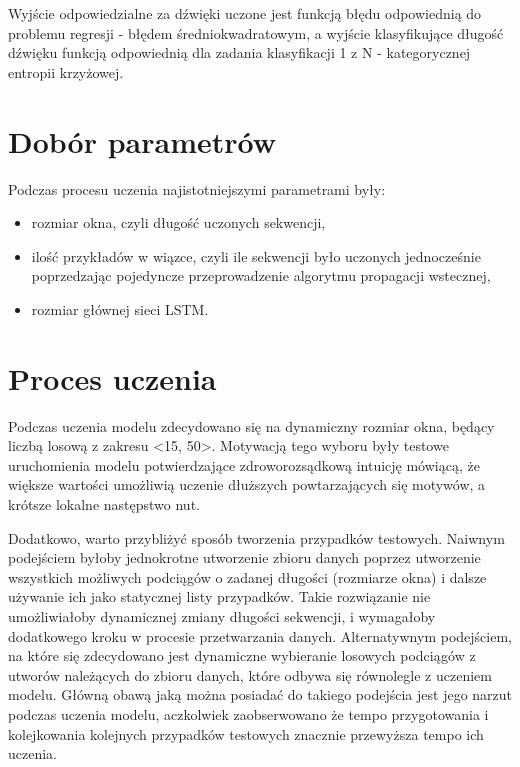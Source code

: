 {{        Wyjście odpowiedzialne za dźwięki uczone jest funkcją błędu odpowiednią do problemu 
        regresji - błędem średniokwadratowym, a wyjście klasyfikujące długość dźwięku funkcją odpowiednią
        dla zadania klasyfikacji 1 z N - kategorycznej entropii krzyżowej.
    }

    \section{Dobór parametrów}
    {
        Podczas procesu uczenia najistotniejszymi parametrami były:
        \begin{itemize}
            \item rozmiar okna, czyli długość uczonych sekwencji,
            \item ilość przykładów w wiązce, czyli ile sekwencji było uczonych jednocześnie
            poprzedzając pojedyncze przeprowadzenie algorytmu propagacji wstecznej,
            \item rozmiar głównej sieci LSTM.
        \end{itemize}
    }

    \section{Proces uczenia}
    {
        Podczas uczenia modelu zdecydowano się na dynamiczny rozmiar okna,
        będący liczbą losową z zakresu <15, 50>. Motywacją tego wyboru były testowe 
        uruchomienia modelu potwierdzające zdroworozsądkową intuicję mówiącą, że większe wartości
        umożliwią uczenie dłuższych powtarzających się motywów, a krótsze lokalne następstwo nut.

        Dodatkowo, warto przybliżyć sposób tworzenia przypadków testowych. Naiwnym podejściem byłoby
        jednokrotne utworzenie zbioru danych poprzez utworzenie wszystkich możliwych podciągów o zadanej
        długości (rozmiarze okna) i dalsze używanie ich jako statycznej listy przypadków. 
        Takie rozwiązanie nie umożliwiałoby dynamicznej zmiany długości sekwencji, i wymagałoby dodatkowego 
        kroku w procesie przetwarzania danych. Alternatywnym podejściem, na które się zdecydowano jest dynamiczne
        wybieranie losowych podciągów z utworów należących do zbioru danych, które odbywa się równolegle z uczeniem modelu. 
        Główną obawą jaką można posiadać do takiego podejścia jest jego narzut podczas uczenia modelu, 
        aczkolwiek zaobserwowano że tempo przygotowania i kolejkowania kolejnych przypadków testowych znacznie przewyższa tempo ich uczenia.

}}
